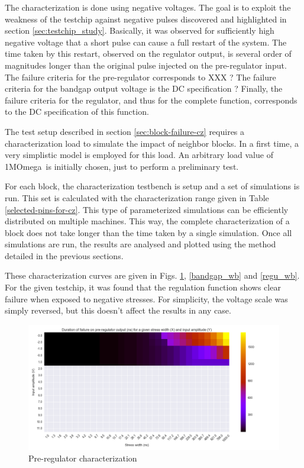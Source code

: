 The characterization is done using negative voltages.
The goal is to exploit the weakness of the testchip against negative pulses discovered and highlighted in section \ref{sec:testchip_study}.
Basically, it was observed for sufficiently high negative voltage that a short pulse can cause a full restart of the system.
The time taken by this restart, observed on the regulator output, is several order of magnitudes longer than the original pulse injected on the pre-regulator input.
The failure criteria for the pre-regulator corresponds to XXX ?
The failure criteria for the bandgap output voltage is the DC specification ?
Finally, the failure criteria for the regulator, and thus for the complete function, corresponds to the DC specification of this function.

The test setup described in section \ref{sec:block-failure-cz} requires a characterization load to simulate the impact of neighbor blocks.
In a first time, a very simplistic model is employed for this load.
An arbitrary load value of 1M\textgreek{Omega}\ is initially chosen, just to perform a preliminary test.

For each block, the characterization testbench is setup and a set of simulations is run.
This set is calculated with the characterization range given in Table \ref{selected-pins-for-cz}.
This type of parameterized simulations can be efficiently distributed on multiple machines.
This way, the complete characterization of a block does not take longer than the time taken by a single simulation.
Once all simulations are run, the results are analysed and plotted using the method detailed in the previous sections.

These characterization curves are given in Figs. \ref{pre_regu_wb}, \ref{bandgap_wb} and \ref{regu_wb}.
For the given testchip, it was found that the regulation function shows clear failure when exposed to negative stresses.
For simplicity, the voltage scale was simply reversed, but this doesn't affect the results in any case.

\begin{figure}[!htbp]
  \centering
  \includegraphics[width=\textwidth]{src/4/figures/preregulator_cz.png}
  \caption{Pre-regulator characterization}
  \label{pre_regu_wb}
\end{figure}

